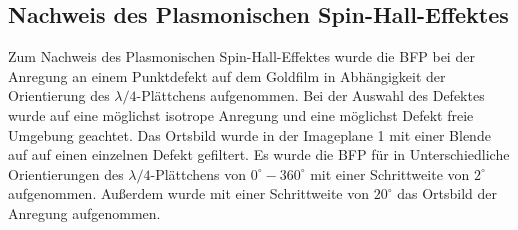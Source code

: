 \documentclass[titlepage]{article}
\begin{document}
	
	
	\subsection{Nachweis des Plasmonischen Spin-Hall-Effektes}
	Zum Nachweis des Plasmonischen Spin-Hall-Effektes wurde die BFP bei der Anregung an einem Punktdefekt auf dem Goldfilm in Abhängigkeit der Orientierung des $\lambda /4$-Plättchens aufgenommen. Bei der Auswahl des Defektes wurde auf eine möglichst isotrope Anregung und eine möglichst Defekt freie Umgebung geachtet. Das Ortsbild wurde in der Imageplane 1 mit einer Blende auf auf einen einzelnen Defekt gefiltert. Es wurde die BFP für in Unterschiedliche Orientierungen des $\lambda/4$-Plättchens von $0^\circ-360^\circ$ mit einer Schrittweite von $2^\circ$ aufgenommen. Außerdem wurde mit einer Schrittweite von $20^\circ$ das Ortsbild der Anregung aufgenommen.
	
\end{document}
